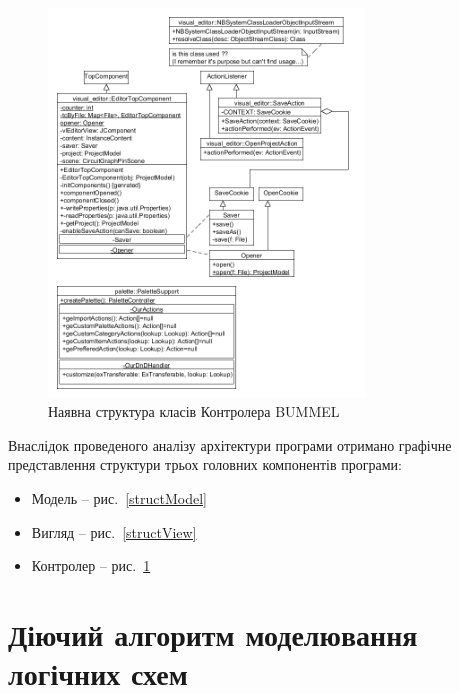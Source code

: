\documentclass[12pt,a4paper]{article}
\begin{document}
\begin{figure}[h]
  \centering
    \includegraphics[width=0.75\textwidth]{class-diagram-controller.png}
  \caption{Наявна структура класів Контролера BUMMEL\label{structController}}
\end{figure}

Внаслідок проведеного аналізу архітектури програми отримано графічне представлення структури трьох головних компонентів програми:
\begin{itemize}
  \item Модель -- рис.~\ref{structModel}
  \item Вигляд -- рис.~\ref{structView}
  \item Контролер -- рис.~\ref{structController}
\end{itemize}

\clearpage

\section{Діючий алгоритм моделювання логічних схем}

\end{document}
